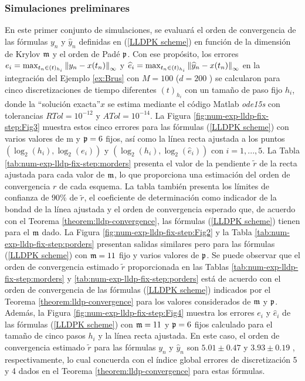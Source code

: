 \subsubsection{Simulaciones preliminares}
En este primer conjunto de simulaciones, se evaluará el orden de convergencia de las fórmulas $y_n$ y $\widehat{y}_n$ definidas en (\ref{LLDPK scheme}) en función de la dimensión de Krylov $\mathfrak{m}$ y el orden de Padé $\mathfrak{p}$. Con ese propósito, los errores $e_i=\max_{t_n\in(t)_{h_i}}\left\lVert y_n-x(t_n) \right\rVert_\infty$ y $\widehat{e}_i=\max_{t_n\in(t )_{h_i}}\left\lVert \widehat{y}_n-x(t_n) \right\rVert_\infty$ en la integración del Ejemplo \ref{ex:Brus} con $M=100$ ($d=200$ ) se calcularon para cinco discretizaciones de tiempo diferentes $(t)_{h_i}$ con un tamaño de paso fijo $h_i$, donde la \textquotedblleft solución exacta\textquotedblright $x$ se estima mediante el código Matlab \textit{ode15s} con tolerancias $RTol=10^{ -12}$ y $ATol=10^{-14}$. La Figura \ref{fig:num-exp-lldp-fix-step:Fig3} muestra estos cinco errores para las fórmulas (\ref{LLDPK scheme}) con varios valores de m y $\mathfrak{p}=6$ fijos, así como la línea recta ajustada a los puntos $(\log_2( h_i),\log_2(e_i))$ y $(\log_2(h_i),\log_2(\widehat{e}_i))$ con $i=1,...,5$. La Tabla \ref{tab:num-exp-lldp-fix-step:morders} presenta el valor de la pendiente $\widetilde{r}$ de la recta ajustada para cada valor de $\mathfrak{m}$, lo que proporciona una estimación del orden de convergencia $r$ de cada esquema. La tabla también presenta los límites de confianza de $90\%$ de $\widetilde{r}$, el coeficiente de determinación como indicador de la bondad de la línea ajustada y el orden de convergencia esperado que, de acuerdo con el Teorema \ref{theorem:lldp-convergence}, las fórmulas (\ref{LLDPK scheme}) tienen para el $\mathfrak{m}$ dado. La Figura \ref{fig:num-exp-lldp-fix-step:Fig2} y la Tabla \ref{tab:num-exp-lldp-fix-step:porders} presentan salidas similares pero para las fórmulas (\ref{LLDPK scheme}) con $\mathfrak{m}=11$ fijo y varios valores de $\mathfrak{p}$. Se puede observar que el orden de convergencia estimado $\widetilde{r}$ proporcionada en las Tablas \ref{tab:num-exp-lldp-fix-step:morders} y \ref{tab:num-exp-lldp-fix-step:porders} está de acuerdo con el orden de convergencia de las fórmulas (\ref{LLDPK scheme}) indicados por el Teorema \ref{theorem:lldp-convergence} para los valores considerados de $\mathfrak{m}$ y $\mathfrak{p}$. Además, la Figura \ref{fig:num-exp-lldp-fix-step:Fig4} muestra los errores $e_i$ y $\widehat{e}_i$ de las fórmulas (\ref{LLDPK scheme}) con $\mathfrak{m}=11$ y $\mathfrak{p}=6$ fijos calculado para el tamaño de cinco pasos $h_i$ y la línea recta ajustada. En este caso, el orden de convergencia estimado $\widetilde{r}$ para las fórmulas $y_n$ y $\widehat{y}_n$ son $5.01 \pm 0.47$ y $3.93 \pm 0.19$ , respectivamente, lo cual concuerda con el índice global errores de discretización 5 y 4 dados en el Teorema \ref{theorem:lldp-convergence} para estas fórmulas.


